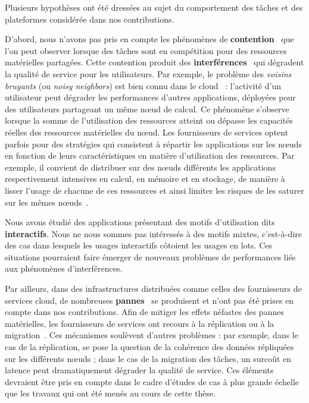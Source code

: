 Plusieurs hypothèses ont été dressées au sujet du comportement des tâches et des plateformes considérée dans nos contributions.

D'abord, nous n'avons pas pris en compte les phénomènes de \textbf{contention}~\cite{vanbeekCPUContentionPredictor2019, jacquetSweetspotVMOversubscribingCPU} que l'on peut observer lorsque des tâches sont en compétition pour des ressources matérielles partagées. Cette contention produit des \textbf{interférences}~\cite{kohAnalysisPerformanceInterference2007, vardasImprovedParallelApplication, dartoisInvestigatingMachineLearning2021} qui dégradent la qualité de service pour les utilisateurs. Par exemple, le problème des \textit{voisins bruyants} (ou \textit{noisy neighbors}) est bien connu dans le cloud~\cite{robbagbyAntimodeleVoisinBruyant} : l'activité d'un utilisateur peut dégrader les performances d'autres applications, déployées pour des utilisateurs partageant un même nœud de calcul. Ce phénomène s'observe lorsque la somme de l'utilisation des ressources atteint ou dépasse les capacités réelles des ressources matérielles du nœud. Les fournisseurs de services optent parfois pour des stratégies qui consistent à répartir les applications sur les nœuds en fonction de leurs caractéristiques en matière d'utilisation des ressources. Par exemple, il convient de distribuer sur des nœuds différents les applications respectivement intensives en calcul, en mémoire et en stockage, de manière à lisser l'usage de chacune de ces ressources et ainsi limiter les risques de les saturer sur les mêmes nœuds~\cite{khandelwalTaureauDeconstructingServerless2020}.

Nous avons étudié des applications présentant des motifs d'utilisation dits \textbf{interactifs}. Nous ne nous sommes pas intéressés à des motifs mixtes, c'est-à-dire des cas dans lesquels les usages interactifs côtoient les usages en lots. Ces situations pourraient faire émerger de nouveaux problèmes de performances liés aux phénomènes d'interférences.

Par ailleurs, dans des infrastructures distribuées comme celles des fournisseurs de services cloud, de nombreuses \textbf{pannes}~\cite{javadiFailureTraceArchive2013, galletModelSpaceCorrelatedFailures2010, BareMetal70B} se produisent et n'ont pas été prises en compte dans nos contributions. Afin de mitiger les effets néfastes des pannes matérielles, les fournisseurs de services ont recours à la réplication ou à la migration~\cite{nazaricheraghlouSurveyFaultTolerance2016}. Ces mécanismes soulèvent d'autres problèmes : par exemple, dans le cas de la réplication, se pose la question de la cohérence des données répliquées sur les différents nœuds ; dans le cas de la migration des tâches, un surcoût en latence peut dramatiquement dégrader la qualité de service. Ces éléments devraient être pris en compte dans le cadre d'études de cas à plus grande échelle que les travaux qui ont été menés au cours de cette thèse.

